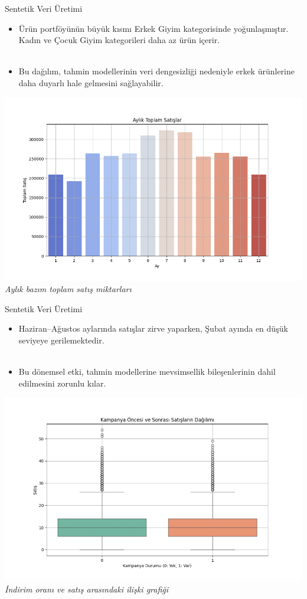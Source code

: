 \documentclass[12pt]{beamer}
\begin{document}
\begin{frame}{Sentetik Veri Üretimi}
	\begin{itemize}
		\item Ürün portföyünün büyük kısmı Erkek Giyim kategorisinde
		      yoğunlaşmıştır. Kadın ve Çocuk Giyim kategorileri daha az ürün içerir.
		      \\~\\
		\item	Bu dağılım, tahmin modellerinin veri dengesizliği
		      nedeniyle erkek ürünlerine daha duyarlı hale gelmesini sağlayabilir.
	\end{itemize}
\end{frame}

\begin{frame}
	\centering
	\includegraphics[width=0.65\linewidth]{figures/monthly_total_sales.png}
	\vspace{0.5em}
	{\small \textit{Aylık bazım toplam satış miktarları}}
\end{frame}

\begin{frame}{Sentetik Veri Üretimi}
	\begin{itemize}
		\item Haziran–Ağustos aylarında satışlar zirve yaparken, Şubat
		      ayında en düşük seviyeye gerilemektedir.
		      \\~\\
		\item Bu dönemsel etki, tahmin modellerine mevsimsellik
		      bileşenlerinin dahil edilmesini zorunlu kılar.
	\end{itemize}
\end{frame}

\begin{frame}
	\centering

	\includegraphics[width=0.65\linewidth]{figures/campaign_sales_boxplot.png}
	\vspace{0.5em}
	{\small \textit{İndirim oranı ve satış arasındaki ilişki grafiği}}
\end{frame}
\end{document}
